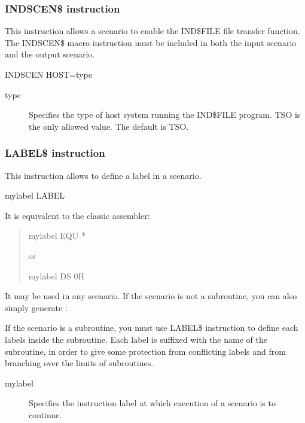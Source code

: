 \documentclass[letterpaper,10pt,english]{sphinxmanual}
\begin{document}
\subsubsection{INDSCEN\$ instruction}
\label{\detokenize{User_Guide:indscen-instruction}}
This instruction allows a scenario to enable the IND\$FILE file transfer function. The INDSCEN\$ macro instruction must
be included in both the input scenario and the output scenario.

\begin{sphinxVerbatim}[commandchars=\\\{\}]
INDSCEN\PYGZdl{} HOST=type
\end{sphinxVerbatim}
\begin{description}
\item[{type}] \leavevmode
Specifies the type of host system running the IND\$FILE program. TSO is the only allowed value. The default is TSO.

\end{description}


\subsubsection{LABEL\$ instruction}
\label{\detokenize{User_Guide:label-instruction}}
This instruction allows to define a label in a scenario.

\begin{sphinxVerbatim}[commandchars=\\\{\}]
mylabel LABEL\PYGZdl{}
\end{sphinxVerbatim}

It is equivalent to the classic assembler:
\begin{quote}

mylabel EQU *

or

mylabel DS 0H
\end{quote}

It may be used in any scenario. If the scenario is not a subroutine, you can also simply generate :

\begin{sphinxVerbatim}[commandchars=\\\{\}]
  
\end{sphinxVerbatim}

If the scenario is a subroutine, you must use LABEL\$ instruction to define each labels inside the subroutine. Each label is suffixed with the name of the subroutine, in order to give some protection from conflicting labels and from branching over the limits of subroutines.
\begin{description}
\item[{mylabel}] \leavevmode
Specifies the instruction label at which execution of a scenario is to continue.

\end{description}
\end{document}
